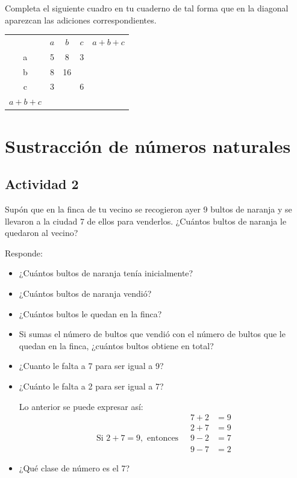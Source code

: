 \documentclass[10pt,twoside]{article}
\begin{document}
\begin{enumerate}
\begin{minipage}{.45\textwidth}
\item Completa el siguiente cuadro en tu cuaderno de tal forma que en la diagonal
aparezcan las adiciones correspondientes.
\end{minipage}\hfill
\begin{minipage}{.45\textwidth}
\begin{tabular}{ccccc}
 & $a$ & $b$ & $c$ & $a+b+c$ \\ 
\cline{2-5} 
a & \vline \hfill 5 \hfill \vline & 8 \hfill \vline & 3 \hfill \vline & \hfill \vline   \\ \cline{2-5}
b & \vline \hfill 8 \hfill \vline & 16 \hfill \vline & \hfill \vline & \\ \cline{2-4}
c & \vline \hfill 3 \hfill \vline & \hfill \vline & 6 \hfill \vline & \\ \cline{2-4}
$a+b+c$ &  \vline \hfill \hspace*{10pt} \hfill \vline & & \\ \cline{2-2}
\end{tabular} 
\end{minipage}
\end{enumerate}
\section*{Sustracci\'on de n\'umeros naturales}
\subsection*{Actividad 2}
Supón que en la finca de tu vecino se recogieron ayer 9 bultos de naranja y se
llevaron a la ciudad 7 de ellos para venderlos. ¿Cuántos bultos de naranja le
quedaron al vecino?

Responde:
\begin{itemize}
\item ¿Cuántos bultos de naranja tenía inicialmente?
\item ¿Cuántos bultos de naranja vendió?
\item ¿Cuántos bultos le quedan en la finca?
\item Si sumas el número de bultos que vendió con el número de bultos que le
    quedan en la finca, ¿cuántos bultos obtiene en total?
\item ¿Cuanto le falta a 7 para ser igual a 9?
\item ¿Cuánto le falta a 2 para ser igual a 7?

Lo anterior se puede expresar así: 
\begin{align*}
&7 + 2 &= 9\\
&2+7&=9\\
\mbox{Si } 2+7=9, \mbox{ entonces }\; &9-2&=7\\
&9-7&=2 
\end{align*}
\item ¿Qué clase de número es el 7?
\end{itemize}
\end{document}
